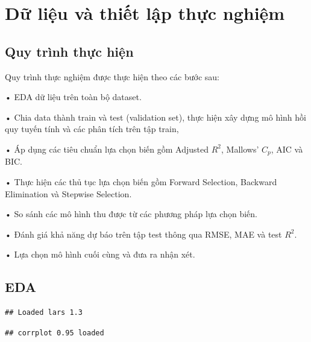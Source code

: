 \documentclass[
]{article}
\author{}
\date{\vspace{-2.5em}}
\newenvironment{Shaded}{\begin{snugshade}}{\end{snugshade}}
\newcommand{\AttributeTok}[1]{\textcolor[rgb]{0.13,0.29,0.53}{#1}}
\newcommand{\FunctionTok}[1]{\textcolor[rgb]{0.13,0.29,0.53}{\textbf{#1}}}
\newcommand{\NormalTok}[1]{#1}
\newcommand{\OtherTok}[1]{\textcolor[rgb]{0.56,0.35,0.01}{#1}}
\newcommand{\SpecialCharTok}[1]{\textcolor[rgb]{0.81,0.36,0.00}{\textbf{#1}}}
\begin{document}
\section{Dữ liệu và thiết lập thực
nghiệm}\label{dux1eef-liux1ec7u-vuxe0-thiux1ebft-lux1eadp-thux1ef1c-nghiux1ec7m}

\subsection{Quy trình thực hiện}\label{quy-truxecnh-thux1ef1c-hiux1ec7n}

Quy trình thực nghiệm được thực hiện theo các bước sau:

• EDA dữ liệu trên toàn bộ dataset.

• Chia data thành train và test (validation set), thực hiện xây dựng mô
hình hồi quy tuyến tính và các phân tích trên tập train,

• Áp dụng các tiêu chuẩn lựa chọn biến gồm Adjusted \(R^2\), Mallows'
\(C_p\), AIC và BIC.

• Thực hiện các thủ tục lựa chọn biến gồm Forward Selection, Backward
Elimination và Stepwise Selection.

• So sánh các mô hình thu được từ các phương pháp lựa chọn biến.

• Đánh giá khả năng dự báo trên tập test thông qua RMSE, MAE và test
\(R^2\).

• Lựa chọn mô hình cuối cùng và đưa ra nhận xét.

\subsection{EDA}\label{eda}

\begin{verbatim}
## Loaded lars 1.3
\end{verbatim}

\begin{verbatim}
## corrplot 0.95 loaded
\end{verbatim}

\begin{Shaded}
\end{Shaded}
\end{document}
